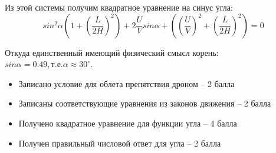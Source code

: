 \begin{enumerate}
    Из этой системы получим квадратное уравнение на синус угла: 
    $$sin^2\alpha \left(1+\left(\frac{L}{2H}\right)^2 \right)+2 \frac{U}{V} sin\alpha + \left(\left(\frac{U}{V}\right)^2+\left(\frac{L}{2H}\right)^2\right)=0$$

    Откуда единственный имеющий физический смысл корень: $sin\alpha =0.49, т.е. \alpha \approx 30^\circ$.


    \markSection
    
    \begin{itemize}
        \item Записано условие для облета препятствия дроном – 2 балла
        \item Записаны соответствующие уравнения из законов движения – 2 балла
        \item Получено квадратное уравнение для функции угла – 4 балла
        \item Получен правильный числовой ответ для угла – 2 балла
    \end{itemize}
\end{enumerate}